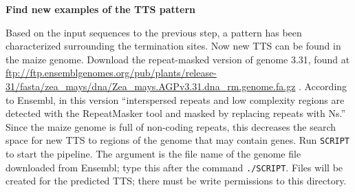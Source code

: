 \documentclass[12pt,letterpaper]{report}
\begin{document}
\begin{center}
\textbf{{\large Find new examples of the TTS pattern}}
\end{center}
Based on the input sequences to the previous step, a pattern has been characterized surrounding the termination sites. Now new TTS can be found in the maize genome. Download the repeat-masked version of genome 3.31, found at \url{ftp://ftp.ensemblgenomes.org/pub/plants/release-31/fasta/zea_mays/dna/Zea_mays.AGPv3.31.dna_rm.genome.fa.gz} \cite{maize}. According to Ensembl, in this version ``interspersed repeats and low complexity regions are detected with the RepeatMasker tool and masked by replacing repeats with Ns.'' Since the maize genome is full of non-coding repeats, this decreases the search space for new TTS to regions of the genome that may contain genes.
\indent Run \texttt{SCRIPT} to start the pipeline. The argument is the file name of the genome file downloaded from Ensembl; type this after the command \texttt{./SCRIPT}. Files will be created for the predicted TTS; there must be write permissions to this directory. 



\end{document}
